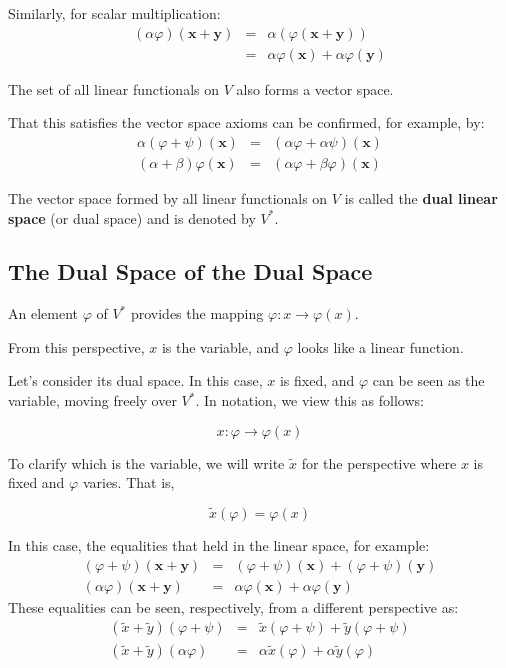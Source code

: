 \documentclass[uplatex,a4j,12pt,dvipdfmx]{jsarticle}
\begin{document}
Similarly, for scalar multiplication:
\[
	\begin{array}{rcl}
		(\alpha \varphi) (\mathbf{x} + \mathbf{y}) & = & \alpha ( \varphi (\mathbf{x} + \mathbf{y}) )
		\\
		                                           & = &
		\alpha \varphi (\mathbf{x}) + \alpha \varphi (\mathbf{y})
	\end{array}
\]

The set of all linear functionals on $V$ also forms a vector space.

That this satisfies the vector space axioms can be confirmed, for example, by:
\[
	\begin{array}{rcl}
		\alpha (\varphi + \psi) (\mathbf{x} ) & = & ( \alpha \varphi + \alpha \psi) (\mathbf{x} )
		\\
		(\alpha + \beta) \varphi (\mathbf{x}) & = & (\alpha \varphi + \beta \varphi) (\mathbf{x})
	\end{array}
\]

The vector space formed by all linear functionals on $V$ is called the \textbf{dual linear space} (or dual space) and is denoted by $V^{*}$.

\subsection{The Dual Space of the Dual Space}

An element $\varphi$ of $V^{*}$ provides the mapping $\varphi : x \to \varphi(x)$.

From this perspective, $x$ is the variable, and $\varphi$ looks like a linear function.

Let's consider its dual space.
In this case, $x$ is fixed, and $\varphi$ can be seen as the variable, moving freely over $V^{*}$.
In notation, we view this as follows:

$$
	x : \varphi \to \varphi(x)
$$

To clarify which is the variable, we will write $\tilde{x}$ for the perspective where $x$ is fixed and $\varphi$ varies.
That is,

$$
	\tilde{x}(\varphi) = \varphi(x)
$$

In this case, the equalities that held in the linear space, for example:
\[
	\begin{array}{rcl}
		(\varphi + \psi) (\mathbf{x} + \mathbf{y})
		 & = &
		(\varphi + \psi) (\mathbf{x}) + (\varphi + \psi) (\mathbf{y})
		\\
		(\alpha \varphi) (\mathbf{x} + \mathbf{y})
		 & = &
		\alpha \varphi (\mathbf{x}) + \alpha \varphi (\mathbf{y})
	\end{array}
\]
These equalities can be seen, respectively, from a different perspective as:
\[
	\begin{array}{rcl}
		(\tilde{x} + \tilde{y} ) (\varphi + \psi)
		 & = &
		\tilde{x} (\varphi + \psi)  + \tilde{y} (\varphi + \psi)
		\\
		(\tilde{x} + \tilde{y} ) (\alpha \varphi)
		 & = &
		\alpha \tilde{x} (\varphi) + \alpha \tilde{y} (\varphi)
	\end{array}
\]
\end{document}
